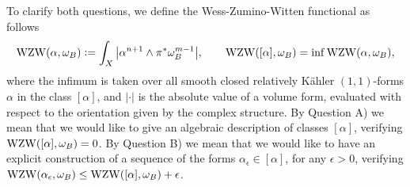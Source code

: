 \documentclass[12pt]{article}
\numberwithin{equation}{section}
\theoremstyle{theorem}
\theoremstyle{definition}
\theoremstyle{remark}
\newcommand{\comp}{\mathbb{C}}
\newcommand{\real}{\mathbb{R}}
\begin{document}

	\par  
	To clarify both questions, we define the Wess-Zumino-Witten functional as follows
	\begin{equation}\label{defn_wzwfunc}
		{\rm{WZW}}(\alpha, \omega_B) := \int_X \big| \alpha^{n + 1} \wedge \pi^* \omega_B^{m - 1} \big|, \qquad {\rm{WZW}}([\alpha], \omega_B) = \inf {\rm{WZW}}(\alpha, \omega_B),
 	\end{equation}
 	where the infimum is taken over all smooth closed relatively Kähler $(1, 1)$-forms $\alpha$ in the class $[\alpha]$, and $| \cdot |$ is the absolute value of a volume form, evaluated with respect to the orientation given by the complex structure.
 	By Question A) we mean that we would like to give an algebraic description of classes $[\alpha]$, verifying ${\rm{WZW}}([\alpha], \omega_B) = 0$.
 	By Question B) we mean that we would like to have an explicit construction of a sequence of the forms $\alpha_{\epsilon} \in [\alpha]$, for any $\epsilon > 0$, verifying ${\rm{WZW}}(\alpha_{\epsilon}, \omega_B) \leq {\rm{WZW}}([\alpha], \omega_B) + \epsilon$.
\end{document}
